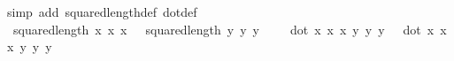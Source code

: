 \begin{isabellebody}
\ {\isacharparenleft}{\kern0pt}simp\ add{\isacharcolon}{\kern0pt}\ squared{\isacharunderscore}{\kern0pt}length{\isacharunderscore}{\kern0pt}def\ dot{\isacharunderscore}{\kern0pt}def{\isacharparenright}{\kern0pt}\isanewline
\ \ \isamarkupfalse%
\ {}{\isacharcolon}{\kern0pt}\ {\isachardoublequoteopen}{\isacharparenleft}{\kern0pt}squared{\isacharunderscore}{\kern0pt}length\ {\isacharparenleft}{\kern0pt}x{}{\isacharcomma}{\kern0pt}\ x{}{\isacharcomma}{\kern0pt}\ x{}{\isacharparenright}{\kern0pt}\ {\isacharparenright}{\kern0pt}\ {\isacharasterisk}{\kern0pt}\ {\isacharparenleft}{\kern0pt}squared{\isacharunderscore}{\kern0pt}length\ {\isacharparenleft}{\kern0pt}y{}{\isacharcomma}{\kern0pt}\ y{}{\isacharcomma}{\kern0pt}\ y{}{\isacharparenright}{\kern0pt}\ {\isacharparenright}{\kern0pt}\ {\isacharminus}{\kern0pt}\ \ \ {\isacharparenleft}{\kern0pt}dot\ {\isacharparenleft}{\kern0pt}x{}{\isacharcomma}{\kern0pt}\ x{}{\isacharcomma}{\kern0pt}\ x{}{\isacharparenright}{\kern0pt}\ {\isacharparenleft}{\kern0pt}y{}{\isacharcomma}{\kern0pt}\ y{}{\isacharcomma}{\kern0pt}\ y{}{\isacharparenright}{\kern0pt}{\isacharparenright}{\kern0pt}\ {\isacharasterisk}{\kern0pt}\ \ {\isacharparenleft}{\kern0pt}dot\ {\isacharparenleft}{\kern0pt}x{}{\isacharcomma}{\kern0pt}\ x{}{\isacharcomma}{\kern0pt}\ x{}{\isacharparenright}{\kern0pt}\ {\isacharparenleft}{\kern0pt}y{}{\isacharcomma}{\kern0pt}\ y{}{\isacharcomma}{\kern0pt}\ y{}{\isacharparenright}{\kern0pt}{\isacharparenright}{\kern0pt}\ {\isacharequal}{\kern0pt}\ \isanewline

\end{isabellebody}
